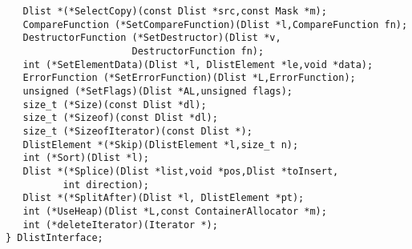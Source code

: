\begin{verbatim}
   Dlist *(*SelectCopy)(const Dlist *src,const Mask *m);
   CompareFunction (*SetCompareFunction)(Dlist *l,CompareFunction fn);
   DestructorFunction (*SetDestructor)(Dlist *v,
                      DestructorFunction fn);
   int (*SetElementData)(Dlist *l, DlistElement *le,void *data);
   ErrorFunction (*SetErrorFunction)(Dlist *L,ErrorFunction);
   unsigned (*SetFlags)(Dlist *AL,unsigned flags);
   size_t (*Size)(const Dlist *dl);
   size_t (*Sizeof)(const Dlist *dl);
   size_t (*SizeofIterator)(const Dlist *);
   DlistElement *(*Skip)(DlistElement *l,size_t n);
   int (*Sort)(Dlist *l);
   Dlist *(*Splice)(Dlist *list,void *pos,Dlist *toInsert,
          int direction);
   Dlist *(*SplitAfter)(Dlist *l, DlistElement *pt);
   int (*UseHeap)(Dlist *L,const ContainerAllocator *m);
   int (*deleteIterator)(Iterator *);
} DlistInterface;
\end{verbatim}
